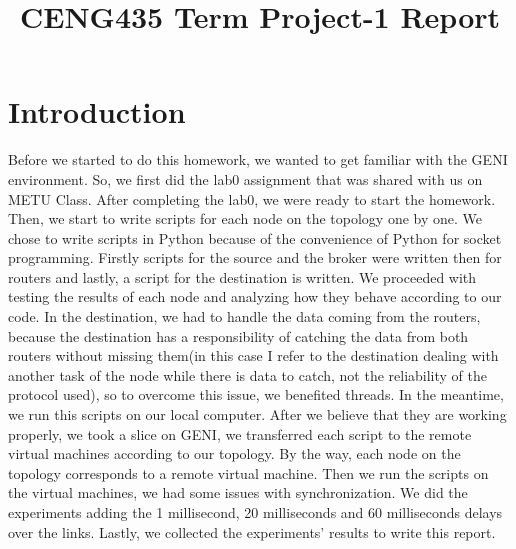 \documentclass[conference]{IEEEtran}
\begin{document}
\title{CENG435 Term Project-1 Report\\
{\footnotesize}
}

\author{
\and
{}
}

\maketitle

\section{Introduction}
Before we started to do this homework, we wanted to get familiar with the GENI environment. So, we first did the lab0 assignment that was shared with us on METU Class. After completing the lab0, we were ready to start the homework. Then, we start to write scripts for each node on the topology one by one. We chose to write scripts in Python because of the convenience of Python for socket programming. Firstly scripts for the source and the broker were written then for routers and lastly, a script for the destination is written. We proceeded with testing the results of each node and analyzing how they behave according to our code. In the destination, we had to handle the data coming from the routers, because the destination has a responsibility of catching the data from both routers without missing them(in this case I refer to the destination dealing with another task of the node while there is data to catch, not the reliability of the protocol used), so to overcome this issue, we benefited threads. In the meantime, we run this scripts on our local computer. After we believe that they are working properly, we took a slice on GENI, we transferred each script to the remote virtual machines according to our topology. By the way, each node on the topology corresponds to a remote virtual machine. Then we run the scripts on the virtual machines, we had some issues with synchronization. We did the experiments adding the 1 millisecond, 20 milliseconds and 60 milliseconds delays over the links. Lastly, we collected the experiments' results to write this report. 
\end{document}

